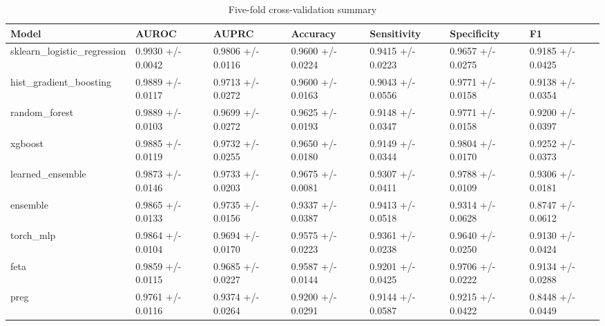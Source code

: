 \begin{table}[ht]
\centering
\caption{Five-fold cross-validation summary}
\label{tab:cross-validation}
\begin{tabular}{lllllll}
\hline
Model & AUROC & AUPRC & Accuracy & Sensitivity & Specificity & F1 \\
\hline
sklearn\_logistic\_regression & 0.9930 +/- 0.0042 & 0.9806 +/- 0.0116 & 0.9600 +/- 0.0224 & 0.9415 +/- 0.0223 & 0.9657 +/- 0.0275 & 0.9185 +/- 0.0425 \\
hist\_gradient\_boosting & 0.9889 +/- 0.0117 & 0.9713 +/- 0.0272 & 0.9600 +/- 0.0163 & 0.9043 +/- 0.0556 & 0.9771 +/- 0.0158 & 0.9138 +/- 0.0354 \\
random\_forest & 0.9889 +/- 0.0103 & 0.9699 +/- 0.0272 & 0.9625 +/- 0.0193 & 0.9148 +/- 0.0347 & 0.9771 +/- 0.0158 & 0.9200 +/- 0.0397 \\
xgboost & 0.9885 +/- 0.0119 & 0.9732 +/- 0.0255 & 0.9650 +/- 0.0180 & 0.9149 +/- 0.0344 & 0.9804 +/- 0.0170 & 0.9252 +/- 0.0373 \\
learned\_ensemble & 0.9873 +/- 0.0146 & 0.9733 +/- 0.0203 & 0.9675 +/- 0.0081 & 0.9307 +/- 0.0411 & 0.9788 +/- 0.0109 & 0.9306 +/- 0.0181 \\
ensemble & 0.9865 +/- 0.0133 & 0.9735 +/- 0.0156 & 0.9337 +/- 0.0387 & 0.9413 +/- 0.0518 & 0.9314 +/- 0.0628 & 0.8747 +/- 0.0612 \\
torch\_mlp & 0.9864 +/- 0.0104 & 0.9694 +/- 0.0170 & 0.9575 +/- 0.0223 & 0.9361 +/- 0.0238 & 0.9640 +/- 0.0250 & 0.9130 +/- 0.0424 \\
feta & 0.9859 +/- 0.0115 & 0.9685 +/- 0.0227 & 0.9587 +/- 0.0144 & 0.9201 +/- 0.0425 & 0.9706 +/- 0.0222 & 0.9134 +/- 0.0288 \\
preg & 0.9761 +/- 0.0116 & 0.9374 +/- 0.0264 & 0.9200 +/- 0.0291 & 0.9144 +/- 0.0587 & 0.9215 +/- 0.0422 & 0.8448 +/- 0.0449 \\
\hline
\end{tabular}
\end{table}
